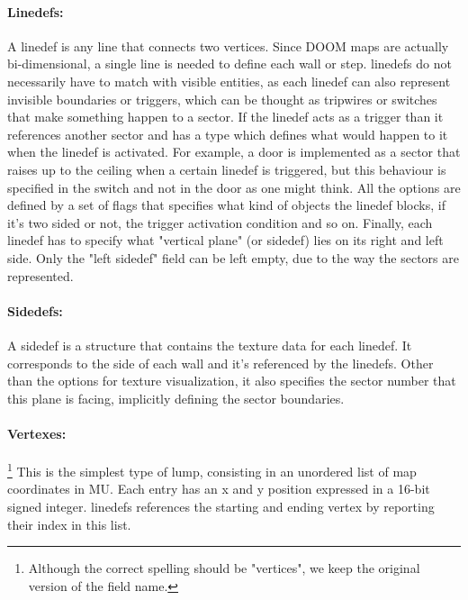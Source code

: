 \paragraph{Linedefs:} A \gls{linedef} is any line that connects two vertices. Since DOOM maps are actually bi-dimensional, a single line is needed to define each wall or step. \glspl{linedef} do not necessarily have to match with visible entities, as each \gls{linedef} can also represent invisible boundaries or triggers, which can be thought as tripwires or switches that make something happen to a sector. If the \gls{linedef} acts as a trigger than it references another sector and has a type which defines what would happen to it when the \gls{linedef} is activated. For example, a door is implemented as a sector that raises up to the ceiling when a certain \gls{linedef} is triggered, but this behaviour is specified in the switch and not in the door as one might think. All the options are defined by a set of flags that specifies what kind of objects the \gls{linedef} blocks, if it's two sided or not, the trigger activation condition and so on.
Finally, each \gls{linedef} has to specify what "vertical plane" (or \gls{sidedef}) lies on its right and left side. Only the "left sidedef" field can be left empty, due to the way the sectors are represented.

\paragraph{Sidedefs:} A \gls{sidedef} is a structure that contains the texture data for each linedef. It corresponds to the side of each wall and it's referenced by the linedefs. Other than the options for texture visualization, it also specifies the sector number that this plane is facing, implicitly defining the sector boundaries.

\paragraph{Vertexes:}\footnote{Although the correct spelling should be "vertices", we keep the original version of the field name.} This is the simplest type of \gls{lump}, consisting in an unordered list of map coordinates in \gls{MU}. Each entry has an x and y position expressed in a 16-bit signed integer. \glspl{linedef} references the starting and ending vertex by reporting their index in this list.

